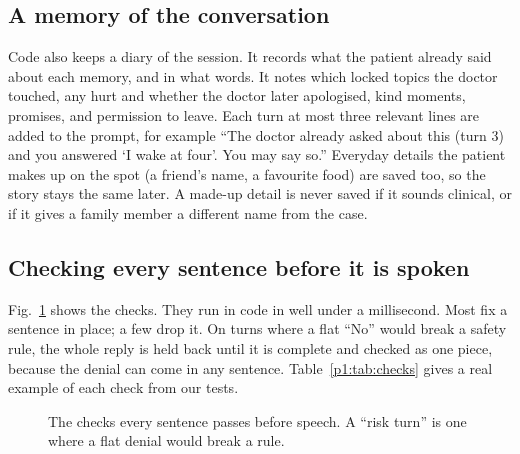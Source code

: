 \documentclass[journal]{IEEEtran}
\begin{document}
\subsection{A memory of the conversation}
Code also keeps a diary of the session. It records what the patient already said about each memory, and in what words. It notes which locked topics the doctor touched, any hurt and whether the doctor later apologised, kind moments, promises, and permission to leave. Each turn at most three
relevant lines are added to the prompt, for example ``The doctor already asked about this (turn 3) and you answered `I wake at four'. You may
say so.'' Everyday details the patient makes up on the spot (a friend's name, a favourite food) are saved too, so the story stays the same
later. A made-up detail is never saved if it sounds clinical, or if it gives a family member a different name from the case.

\subsection{Checking every sentence before it is spoken}
Fig.~\ref{p1:fig:checks} shows the checks. They run in code in well under a millisecond. Most fix a sentence in place; a few drop it. On turns
where a flat ``No'' would break a safety rule, the whole reply is held back until it is complete and checked as one piece, because the
denial can come in any sentence. Table~\ref{p1:tab:checks} gives a real example of each check from our tests.

\begin{figure}[t]
\centering
{}
\caption{The checks every sentence passes before speech. A ``risk turn'' is one where a flat denial would break a rule.}
\label{p1:fig:checks}
\end{figure}
\end{document}
